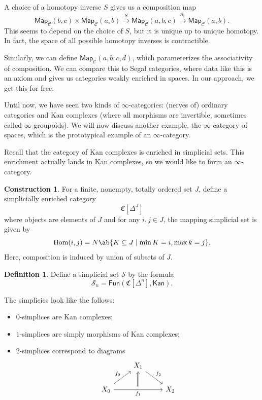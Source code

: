 \documentclass[10pt, oneside]{memoir}
\theoremstyle{definition}
\newtheorem{defn}[thm]{Definition}
\newtheorem{con}[thm]{Construction}
\theoremstyle{remark}
\theoremstyle{plain}
\theoremstyle{definition}
\theoremstyle{remark}
\newcommand{\mc}[1]{\mathcal{#1}}
\newcommand{\mf}[1]{\mathfrak{#1}}
\newcommand{\ms}[1]{\mathsf{#1}}
\newcommand{\1}{\mathbf{1}}
\newcommand{\2}{\mathbf{2}}
\newcommand{\3}{\mathbf{3}}
\DeclareMathOperator{\Hom}{Hom}
\begin{document}
A choice of a homotopy inverse \(S \) gives us a composition map
\[ \ms{Map}_{\mc{C}}(b,c) \times \ms{Map}_{\mc{C}}(a,b) \xrightarrow{S} \ms{Map}_{\mc{C}}(a,b,c) \xrightarrow{\partial_1} \ms{Map}_{\mc{C}}(a,b). \]
This seems to depend on the choice of \(S \), but it is unique up to unique homotopy. In fact, the space of all possible homotopy inverses is contractible.

Similarly, we can define \(\ms{Map}_{\mc{C}}(a,b,c,d) \), which parameterizes the associativity of composition. We can compare this to Segal categories, where data like this is an axiom and gives us categories weakly enriched in spaces. In our approach, we get this for free.

Until now, we have seen two kinds of \(\infty \)-categories: (nerves of) ordinary categories and Kan complexes (where all morphisms are invertible, sometimes called \(\infty \)-groupoids). We will now discuss another example, the \(\infty \)-category of spaces, which is the prototypical example of an \(\infty \)-category.

Recall that the category of Kan complexes is enriched in simplicial sets. This enrichment actually lands in Kan complexes, so we would like to form an \(\infty \)-category.
\begin{con}
    For a finite, nonempty, totally ordered set \(J \), define a simplicially enriched category
    \[ \mf{C}[\Delta^J] \]
    where objects are elements of \(J \) and for any \(i,j \in J \), the mapping simplicial set is given by
    \[ \Hom(i,j) = N \ab\{K \subseteq J \mid \min K = i, \max k = j\}. \]
    Here, composition is induced by union of subsets of \(J \).
\end{con}

\begin{defn}
    Define a simplicial set \(\mc{S} \) by the formula
    \[ \mc{S}_n = \ms{Fun}(\mf{C}[\Delta^n], \ms{Kan}). \]
\end{defn}

The simplicies look like the follows:
\begin{itemize}
    \item \(0 \)-simplices are Kan complexes;
    \item \(1 \)-simplices are simply morphisms of Kan complexes;
    \item \(2 \)-simplices correspond to diagrams
    \begin{equation*}
    \begin{tikzcd}
        & |[alias=B]|X_1 \ar{dr}{f_2} & \\
        X_0 \ar{ur}{f_0} \arrow[rr,"f_1"{swap}, ""{name=U}] \arrow[Rightarrow, from=U, to=B] & & X_2
    \end{tikzcd}
    \end{equation*}
\end{itemize}
\end{document}
